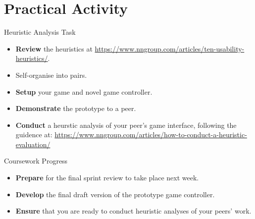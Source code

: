 \documentclass[xcolor={dvipsnames}]{beamer}\usepackage{etoolbox}\newtoggle{printable}\togglefalse{printable}
\begin{document}
\part{Practical Activity}
\frame{\partpage}

\begin{frame}{Heuristic Analysis Task}
	\begin{itemize}
		\item \textbf{Review} the heuristics at \url{https://www.nngroup.com/articles/ten-usability-heuristics/}.
		\item Self-organise into pairs.
		\item \textbf{Setup} your game and novel game controller.
		\item \textbf{Demonstrate} the prototype to a peer.
		\item \textbf{Conduct} a heurstic analysis of your peer's game interface, following the guidence at:
		\url{https://www.nngroup.com/articles/how-to-conduct-a-heuristic-evaluation/}
	\end{itemize}
\end{frame}

\begin{frame}{Coursework Progress}
	\begin{itemize}
		\item \textbf{Prepare} for the final sprint review to take place next week.
		\item \textbf{Develop} the final draft version of the prototype game controller. 
		\item \textbf{Ensure} that you are ready to conduct heuristic analyses of your peers' work. 
	\end{itemize}
\end{frame}


%
\end{document}
